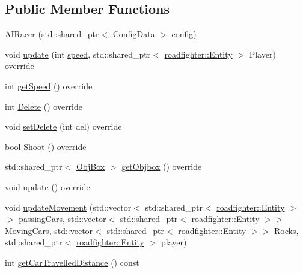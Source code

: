 \subsection*{Public Member Functions}
\begin{DoxyCompactItemize}
\item 
\hyperlink{classroadfighter_1_1AIRacer_a81234077ec46f9824600f3aeb853d4d1}{A\+I\+Racer} (std\+::shared\+\_\+ptr$<$ \hyperlink{classConfigData}{Config\+Data} $>$ config)
\item 
void \hyperlink{classroadfighter_1_1AIRacer_ab6156385195b3d40d44360d40aafa3a6}{update} (int \hyperlink{classroadfighter_1_1AIRacer_a37f6706ba77522ae4efe782da0125062}{speed}, std\+::shared\+\_\+ptr$<$ \hyperlink{classroadfighter_1_1Entity}{roadfighter\+::\+Entity} $>$ Player) override
\item 
int \hyperlink{classroadfighter_1_1AIRacer_a4fa90fd500b2e790fb50cc6f1505688f}{get\+Speed} () override
\item 
int \hyperlink{classroadfighter_1_1AIRacer_af6fe47885c72aeddd02d13e136f4790f}{Delete} () override
\item 
void \hyperlink{classroadfighter_1_1AIRacer_a10823d4a02dbdad6d760020f8cee7afe}{set\+Delete} (int del) override
\item 
bool \hyperlink{classroadfighter_1_1AIRacer_a9e1ce152093bd4f7deb676c443a7851a}{Shoot} () override
\item 
std\+::shared\+\_\+ptr$<$ \hyperlink{structObjBox}{Obj\+Box} $>$ \hyperlink{classroadfighter_1_1AIRacer_a597fa189f88db3ca1534ddf24bb51c22}{get\+Objbox} () override
\item 
void \hyperlink{classroadfighter_1_1AIRacer_a92afd3d1bfcd290d3b012cbfe44d5a77}{update} () override
\item 
void \hyperlink{classroadfighter_1_1AIRacer_a9f80e1203fb9b718d1bd26ffbb562810}{update\+Movement} (std\+::vector$<$ std\+::shared\+\_\+ptr$<$ \hyperlink{classroadfighter_1_1Entity}{roadfighter\+::\+Entity} $>$$>$ passing\+Cars, std\+::vector$<$ std\+::shared\+\_\+ptr$<$ \hyperlink{classroadfighter_1_1Entity}{roadfighter\+::\+Entity} $>$$>$ Moving\+Cars, std\+::vector$<$ std\+::shared\+\_\+ptr$<$ \hyperlink{classroadfighter_1_1Entity}{roadfighter\+::\+Entity} $>$$>$ Rocks, std\+::shared\+\_\+ptr$<$ \hyperlink{classroadfighter_1_1Entity}{roadfighter\+::\+Entity} $>$ player)
\item 
int \hyperlink{classroadfighter_1_1AIRacer_a74314c736ef3c26fb695a2bdf75bcd31}{get\+Car\+Travelled\+Distance} () const
\end{DoxyCompactItemize}
